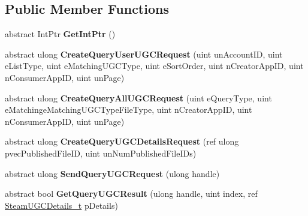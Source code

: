 \subsection*{Public Member Functions}
\begin{DoxyCompactItemize}
\item 
\hypertarget{classValve_1_1Steamworks_1_1ISteamUGC_a6354f35fd2711469cfea942f8886ebbf}{}abstract Int\+Ptr {\bfseries Get\+Int\+Ptr} ()\label{classValve_1_1Steamworks_1_1ISteamUGC_a6354f35fd2711469cfea942f8886ebbf}

\item 
\hypertarget{classValve_1_1Steamworks_1_1ISteamUGC_adcfb45f898276a6479ec0f0cd53c4ded}{}abstract ulong {\bfseries Create\+Query\+User\+U\+G\+C\+Request} (uint un\+Account\+I\+D, uint e\+List\+Type, uint e\+Matching\+U\+G\+C\+Type, uint e\+Sort\+Order, uint n\+Creator\+App\+I\+D, uint n\+Consumer\+App\+I\+D, uint un\+Page)\label{classValve_1_1Steamworks_1_1ISteamUGC_adcfb45f898276a6479ec0f0cd53c4ded}

\item 
\hypertarget{classValve_1_1Steamworks_1_1ISteamUGC_a7244207ccb170f9024987de342d49ff2}{}abstract ulong {\bfseries Create\+Query\+All\+U\+G\+C\+Request} (uint e\+Query\+Type, uint e\+Matchinge\+Matching\+U\+G\+C\+Type\+File\+Type, uint n\+Creator\+App\+I\+D, uint n\+Consumer\+App\+I\+D, uint un\+Page)\label{classValve_1_1Steamworks_1_1ISteamUGC_a7244207ccb170f9024987de342d49ff2}

\item 
\hypertarget{classValve_1_1Steamworks_1_1ISteamUGC_a2d56ea26dd0132ce857ca82b0bb604d6}{}abstract ulong {\bfseries Create\+Query\+U\+G\+C\+Details\+Request} (ref ulong pvec\+Published\+File\+I\+D, uint un\+Num\+Published\+File\+I\+Ds)\label{classValve_1_1Steamworks_1_1ISteamUGC_a2d56ea26dd0132ce857ca82b0bb604d6}

\item 
\hypertarget{classValve_1_1Steamworks_1_1ISteamUGC_afc4e4e5f52ea628c0a80e1ea361a6933}{}abstract ulong {\bfseries Send\+Query\+U\+G\+C\+Request} (ulong handle)\label{classValve_1_1Steamworks_1_1ISteamUGC_afc4e4e5f52ea628c0a80e1ea361a6933}

\item 
\hypertarget{classValve_1_1Steamworks_1_1ISteamUGC_a5eaaa1368abb8d890874ebc2a6d942f1}{}abstract bool {\bfseries Get\+Query\+U\+G\+C\+Result} (ulong handle, uint index, ref \hyperlink{structValve_1_1Steamworks_1_1SteamUGCDetails__t}{Steam\+U\+G\+C\+Details\+\_\+t} p\+Details)\label{classValve_1_1Steamworks_1_1ISteamUGC_a5eaaa1368abb8d890874ebc2a6d942f1}


\end{DoxyCompactItemize}
